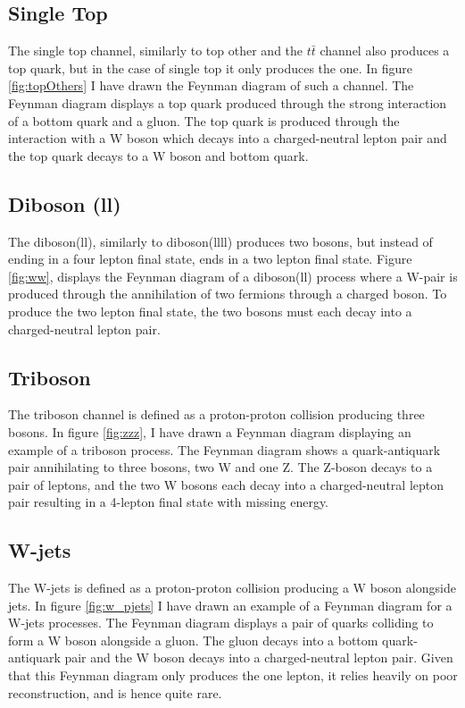 \subsection*{Single Top}
The single top channel, similarly to top other and the $t\bar{t}$ channel also produces a top quark, but in the case of single top 
it only produces the one. In figure \ref{fig:topOthers} I have drawn the Feynman diagram of such a channel. The Feynman diagram displays a
top quark produced through the strong interaction of a bottom quark and a gluon. The top quark is produced through the interaction with a W boson 
which decays into a charged-neutral lepton pair and the top quark decays to a W boson and bottom quark. 

\subsection*{Diboson (ll)}
The diboson(ll), similarly to diboson(llll) produces two bosons, but instead of ending in a four lepton final state, ends in a two lepton final state.
Figure \ref{fig:ww}, displays the Feynman diagram of a diboson(ll) process where a W-pair is produced through the annihilation of two fermions through 
a charged boson. To produce the two lepton final state, the two bosons must each decay into a charged-neutral lepton pair. 

\subsection*{Triboson}
The triboson channel is defined as a proton-proton collision producing three bosons.  In figure \ref{fig:zzz}, I have drawn a Feynman diagram 
displaying an example of a triboson process. The Feynman diagram shows a quark-antiquark pair annihilating to three bosons, two W and one Z. The Z-boson decays 
to a pair of leptons, and the two W bosons each decay into a charged-neutral lepton pair resulting in a 4-lepton final state with missing energy.

\subsection*{W-jets}
The W-jets is defined as a proton-proton collision producing a W boson alongside jets. In figure \ref{fig:w_pjets} I have drawn an example 
of a Feynman diagram for a W-jets processes. The Feynman diagram displays a pair of quarks colliding to form a W boson alongside a gluon. The gluon decays 
into a bottom quark-antiquark pair and the W boson decays into a charged-neutral lepton pair. Given that this Feynman diagram only produces the one lepton, it 
relies heavily on poor reconstruction, and is hence quite rare.

